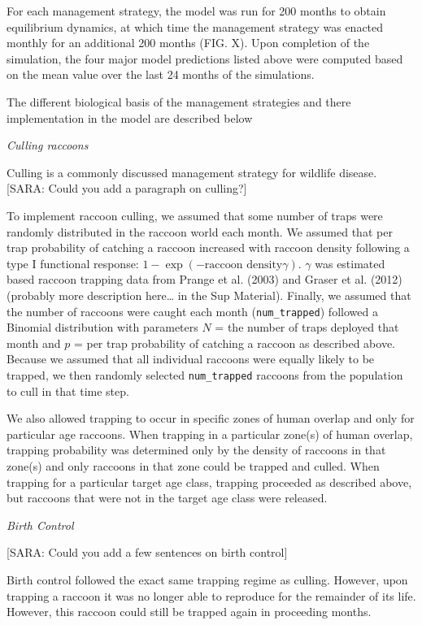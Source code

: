 \documentclass[11pt]{article}
\begin{document}
For each management strategy, the model was run for 200 months to
obtain equilibrium dynamics, at which time the management strategy was
enacted monthly for an additional 200 months (FIG. X). Upon completion
of the simulation, the four major model predictions listed above were
computed based on the mean value over the last 24 months of the simulations.

The different biological basis of the management strategies and there implementation in the model are described below

\bigskip
\noindent
\emph{Culling raccoons}

Culling is a commonly discussed management strategy for wildlife disease. [SARA: Could you add a paragraph on culling?]

To implement raccoon culling, we assumed that some number of traps were
randomly distributed in the raccoon world each month. We assumed that
per trap probability of catching a raccoon increased with raccoon
density following a type I functional response: $1 - \exp(-\text{raccoon
density} \gamma)$. $\gamma$ was estimated
based raccoon trapping data from  Prange et al. (2003) and Graser et al.
(2012) (probably more description here\ldots{} in the Sup Material). Finally, we assumed
that the number of raccoons were caught each month (\texttt{num\_trapped}) followed a Binomial distribution with parameters $N$ = the number of traps deployed that month and $p$ = per trap probability of catching a raccoon as described above. Because we assumed that all
individual raccoons were equally likely to be trapped, we then randomly
selected \texttt{num\_trapped} raccoons from the
population to cull in that time step.

We also allowed trapping to occur in specific zones of human overlap and
only for particular age raccoons. When trapping in a particular zone(s)
of human overlap, trapping probability was determined only by the
density of raccoons in that zone(s) and only raccoons in that zone could
be trapped and culled. When trapping for a particular target age class,
trapping proceeded as described above, but raccoons that were not in the
target age class were released.

\bigskip
\noindent
\emph{Birth Control}

[SARA: Could you add a few sentences on birth control]

Birth control followed the exact same trapping regime as culling.
However, upon trapping a raccoon it was no longer able to reproduce for the remainder of its life. However, this raccoon could still be trapped again in proceeding months. 
\end{document}
